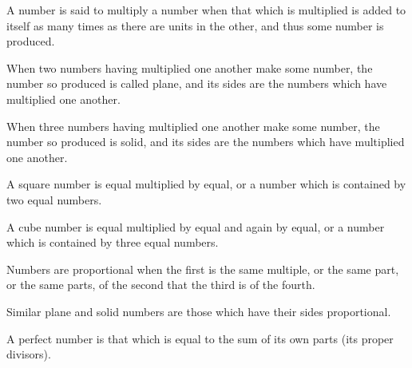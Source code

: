 \documentclass{rrxiv}
\begin{document}
\begin{scope}
\label{def:VII.15}
A number is said to multiply a number when that which is multiplied
is added to itself as many times as there are units in the other, and
thus some number is produced.
\end{scope}

\begin{scope}
\label{def:VII.16}
When two numbers having multiplied one another make some number, the
number so produced is called plane, and its sides are the numbers
which have multiplied one another.
\end{scope}

\begin{scope}
\label{def:VII.17}
When three numbers having multiplied one another make some number,
the number so produced is solid, and its sides are the numbers which
have multiplied one another.
\end{scope}

\begin{scope}
\label{def:VII.18}
A square number is equal multiplied by equal, or a number which is
contained by two equal numbers.
\end{scope}

\begin{scope}
\label{def:VII.19}
A cube number is equal multiplied by equal and again by equal, or a
number which is contained by three equal numbers.
\end{scope}

\begin{scope}
\label{def:VII.20}
Numbers are proportional when the first is the same multiple, or the
same part, or the same parts, of the second that the third is of the
fourth.
\end{scope}

\begin{scope}
\label{def:VII.21}
Similar plane and solid numbers are those which have their sides
proportional.
\end{scope}

\begin{scope}
\label{def:VII.22}
A perfect number is that which is equal to the sum of its own parts
(its proper divisors).
\end{scope}
\end{document}
